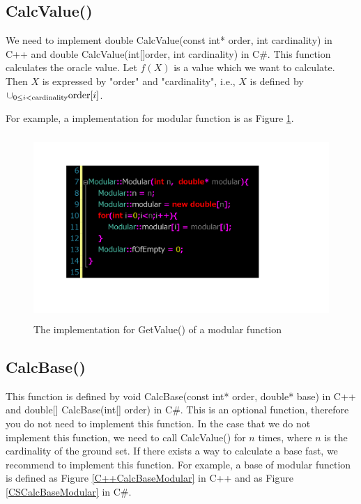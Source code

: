 \documentclass{article}
\begin{document}
\subsection{CalcValue()}
We need to implement double CalcValue(const int* order, int cardinality) in C++
and double CalcValue(int[]order, int cardinality) in C\#.
This function calculates the oracle value.
Let $f(X)$ is a value which we want to calculate.
Then $X$ is expressed by "order" and "cardinality", i.e.,
$X$ is defined by $\cup _{0\leq i < {\rm cardinality}} {\rm order}[i]$.

For example,
a implementation for modular function is as Figure \ref{C++GetValueModular}.
\begin{figure}[h!]\label{C++GetValueModular}
{
\fontsize{10pt}{12pt}\selectfont
\centering
\includegraphics[height=7.0cm]{picture/C++GetValueModular.png}
\caption{The implementation for GetValue() of a modular function}
}
\end{figure}

\subsection{CalcBase()}
This function is defined by  void CalcBase(const int* order, double* base) in C++
and double[] CalcBase(int[] order) in C\#.
This is an optional function, therefore you do not need to implement this function.
In the case that we do not implement this function,
we need to call CalcValue() for $n$ times,
where $n$ is the cardinality of the ground set.
If there exists a way to calculate a base fast,
we recommend to implement this function.
For example,
a base of modular function is defined as Figure \ref{C++CalcBaseModular} in C++ 
and as Figure \ref{CSCalcBaseModular} in C\#.
\end{document}
